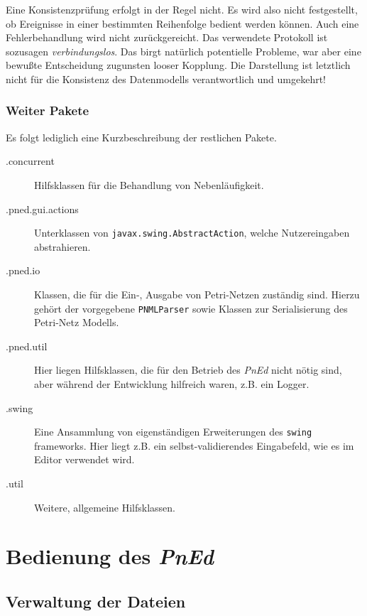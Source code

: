 \documentclass[11pt]{article}
\begin{document}
    Eine Konsistenzprüfung erfolgt in der Regel nicht. Es wird also
    nicht festgestellt, ob Ereignisse in einer bestimmten Reihenfolge
    bedient werden können.  Auch eine Fehlerbehandlung wird nicht
    zurückgereicht.  Das verwendete Protokoll ist sozusagen
    \emph{verbindungslos}. Das birgt natürlich potentielle Probleme, war
    aber eine bewußte Entscheidung zugunsten looser Kopplung.  Die
    Darstellung ist letztlich nicht für die Konsistenz des
    Datenmodells verantwortlich und umgekehrt!
\subsubsection{Weiter Pakete}
\label{sec-1-2-7}

    
    Es folgt lediglich eine Kurzbeschreibung der restlichen Pakete.

\begin{description}
\item[.concurrent] Hilfsklassen für die Behandlung von Nebenläufigkeit.
\item[.pned.gui.actions] Unterklassen von
         \verb|javax.swing.AbstractAction|, welche Nutzereingaben
         abstrahieren.
\item[.pned.io] Klassen, die für die Ein-, Ausgabe von Petri-Netzen
                  zuständig sind. Hierzu gehört der vorgegebene
                  \verb|PNMLParser| sowie Klassen zur Serialisierung
                  des Petri-Netz Modells.
\item[.pned.util] Hier liegen Hilfsklassen, die für den Betrieb des
                    \emph{PnEd} nicht nötig sind, aber während der
                    Entwicklung hilfreich waren, z.B. ein Logger.
\item[.swing] Eine Ansammlung von eigenständigen Erweiterungen des
                \verb|swing| frameworks. Hier liegt z.B. ein
                selbst-validierendes Eingabefeld, wie es im Editor
                verwendet wird.
\item[.util] Weitere, allgemeine Hilfsklassen.
\end{description}

\pagebreak
\section{Bedienung des \emph{PnEd}}
\label{sec-2}
\subsection{Verwaltung der Dateien}
\label{sec-2-1}
\end{document}

